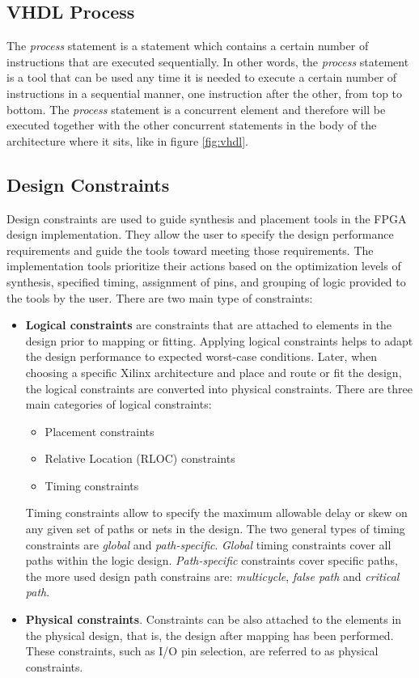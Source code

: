 \subsection{VHDL Process}
\noindent The \textit{process} statement is a statement which contains a certain number of instructions that are executed sequentially. In other words, the \textit{process} statement is a tool that can be used any time it is needed to execute a certain number of instructions in a sequential manner, one instruction after the other, from top to bottom.
\newline
The \textit{process} statement is a concurrent element and therefore will be executed together with the other concurrent statements in the body of the architecture where it sits, like in figure \ref{fig:vhdl}.

\subsection{Design Constraints}
\noindent Design constraints\cite{constraints1} are used to guide synthesis and placement tools in the FPGA design implementation.
They allow the user to specify the design
performance requirements and guide the tools toward meeting those requirements. The
implementation tools prioritize their actions based on the optimization levels of synthesis,
specified timing, assignment of pins, and grouping of logic provided to the tools by the user.
There are two main type of constraints: 
\begin{itemize}
	\item \textbf{Logical constraints} are constraints that are attached to elements in the design prior to
	mapping or fitting. Applying logical constraints helps to adapt the design performance to expected worst-case conditions. Later, when choosing a specific Xilinx architecture and place and route or fit the design, the logical constraints are converted into physical constraints\cite{constraints2}.
	\newline
	There are three main categories of logical constraints:
	\begin{itemize}
		\item Placement constraints
		\item Relative Location (RLOC) constraints
		\item Timing constraints
	\end{itemize}
	Timing constraints\cite{timing98} allow to specify the maximum allowable delay or skew on any given set of paths or nets in the design.
	The two general types of timing constraints are \textit{global} and \textit{path-specific}.
	\textit{Global} timing constraints cover all paths within the logic design.
	\textit{Path-specific} constraints cover specific paths, the more used design path constrains are: \textit{multicycle}, \textit{false path} and \textit{critical path}. 
	\item \textbf{Physical constraints}. Constraints can be also attached to the elements in the physical design, that is, the design
	after mapping has been performed. These constraints, such as I/O pin selection, are referred to as physical constraints.	 
\end{itemize}
